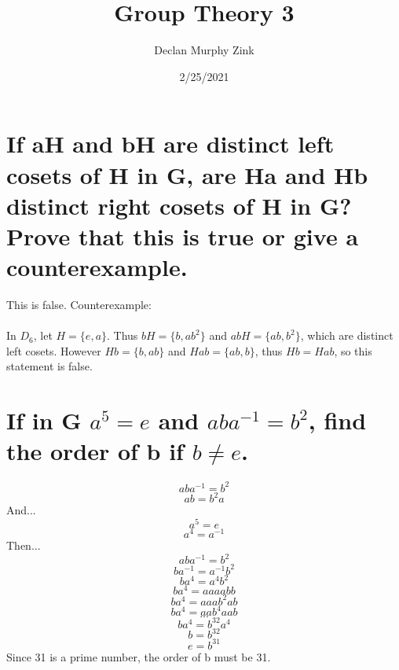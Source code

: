 \documentclass[12pt]{article}
\begin{document}
\title{Group Theory 3}
\author{Declan Murphy Zink}
\date{2/25/2021}
\maketitle

\setcounter{section}{0}

\section{If aH and bH are distinct left cosets of H in G, are Ha and Hb distinct right cosets of H in G? Prove that this is true or give a counterexample.}
This is false. Counterexample:\\\\
In $D_6$, let $H = \{e,a\}$. Thus $bH = \{b,ab^2\}$ and $abH = \{ab, b^2\}$, which are distinct left cosets. However $Hb = \{b,ab\}$ and $Hab = \{ab, b\}$, thus $Hb = Hab$, so this statement is false.

\section{If in G $a^5 = e$ and $aba^{-1} = b^2$, find the order of b if $b \neq e$.}
$$aba^{-1} = b^2$$
$$ab = b^2a$$
And...
$$a^5 = e$$
$$a^4 = a^{-1}$$
Then...
$$aba^{-1} = b^2$$
$$ba^{-1} = a^{-1}b^2$$
$$ba^4 = a^4b^2$$
$$ba^4 = aaaabb$$
$$ba^4 = aaab^2ab$$
$$ba^4 = aab^4aab$$
$$...$$
$$ba^4 = b^{32}a^4$$
$$b = b^{32}$$
$$e = b^{31}$$
Since 31 is a prime number, the order of b must be 31.
\end{document}
